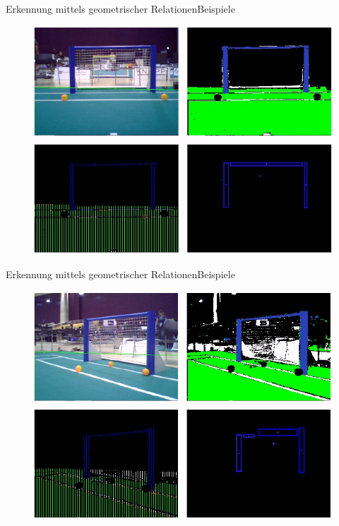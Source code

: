 \documentclass{beamer}
\begin{document}
\begin{frame}{Erkennung mittels geometrischer Relationen}{Beispiele}
\begin{figure}[htp]
\centering
\includegraphics[scale=0.5]{example-detection3.png}
\end{figure}
\end{frame}

\begin{frame}{Erkennung mittels geometrischer Relationen}{Beispiele}
\begin{figure}[htp]
\centering
\includegraphics[scale=0.5]{example-detection4.png}
\end{figure}
\end{frame}
\end{document}
